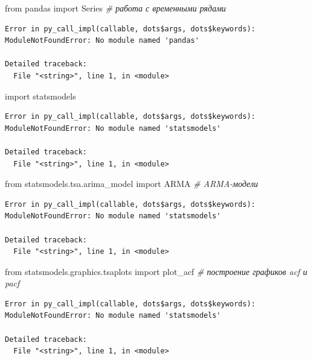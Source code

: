 \documentclass[]{book}
\newenvironment{Shaded}{\begin{snugshade}}{\end{snugshade}}
\newcommand{\CommentTok}[1]{\textcolor[rgb]{0.56,0.35,0.01}{\textit{#1}}}
\newcommand{\ImportTok}[1]{#1}
\newcommand{\NormalTok}[1]{#1}
\begin{document}
\begin{Shaded}
\begin{Highlighting}[]
\ImportTok{from}\NormalTok{ pandas }\ImportTok{import}\NormalTok{ Series }\CommentTok{# работа с временными рядами}
\end{Highlighting}
\end{Shaded}

\begin{verbatim}
Error in py_call_impl(callable, dots$args, dots$keywords): ModuleNotFoundError: No module named 'pandas'

Detailed traceback: 
  File "<string>", line 1, in <module>
\end{verbatim}

\begin{Shaded}
\begin{Highlighting}[]
\ImportTok{import}\NormalTok{ statsmodels}
\end{Highlighting}
\end{Shaded}

\begin{verbatim}
Error in py_call_impl(callable, dots$args, dots$keywords): ModuleNotFoundError: No module named 'statsmodels'

Detailed traceback: 
  File "<string>", line 1, in <module>
\end{verbatim}

\begin{Shaded}
\begin{Highlighting}[]
\ImportTok{from}\NormalTok{ statsmodels.tsa.arima_model }\ImportTok{import}\NormalTok{ ARMA }\CommentTok{# ARMA-модели}
\end{Highlighting}
\end{Shaded}

\begin{verbatim}
Error in py_call_impl(callable, dots$args, dots$keywords): ModuleNotFoundError: No module named 'statsmodels'

Detailed traceback: 
  File "<string>", line 1, in <module>
\end{verbatim}

\begin{Shaded}
\begin{Highlighting}[]
\ImportTok{from}\NormalTok{ statsmodels.graphics.tsaplots }\ImportTok{import}\NormalTok{ plot_acf }\CommentTok{# построение графиков acf и pacf}
\end{Highlighting}
\end{Shaded}

\begin{verbatim}
Error in py_call_impl(callable, dots$args, dots$keywords): ModuleNotFoundError: No module named 'statsmodels'

Detailed traceback: 
  File "<string>", line 1, in <module>
\end{verbatim}
\end{document}
